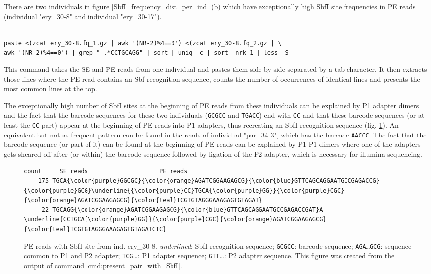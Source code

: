 \documentclass[a4paper,12pt,times,print,index,custombib,custommargin]{PhDThesisPSnPDF}\usepackage[]{graphicx}\usepackage[]{color}
\begin{document}
There are two individuals in figure \ref{SbfI_frequency_dist_per_ind} (b) which have exceptionally high SbfI site frequencies in PE reads (individual "ery\_30-8" and individual "ery\_30-17").
%
\begin{cmd}
\captionsetup{type=cmd} %
\begin{Verbatim}[formatcom=\color{darkgray}, fontsize=\scriptsize]

paste <(zcat ery_30-8.fq_1.gz | awk '(NR-2)%4==0') <(zcat ery_30-8.fq_2.gz | \
awk '(NR-2)%4==0') | grep " .*CCTGCAGG" | sort | uniq -c | sort -nrk 1 | less -S
\end{Verbatim}
\caption{\small This command takes the SE and PE reads from one individual and pastes them side by side separated by a tab character. It then extracts those lines where the PE read contains an Sbf recognition sequence, counts the number of occurrences of identical lines and presents the most common lines at the top.}
\label{cmd:present_pair_with_SbfI}
\end{cmd}
%
The exceptionally high number of SbfI sites at the beginning of PE reads from these individuals can be explained by P1 adapter dimers and the fact that the barcode sequences for these two individuals (\texttt{GCGCC} and \texttt{TGACC}) end with \texttt{CC} and that these barcode sequences (or at least the \texttt{CC} part) appear at the beginning of PE reads into P1 adapters, thus recreating an SbfI recognition sequence (fig. \ref{SbfI_in_PE_reads_of_ery_30-8}). An equivalent but not as frequent pattern can be found in the reads of individual "par\_34-3", which has the barcode \texttt{AACCC}. The fact that the barcode sequence (or part of it) can be found at the beginning of PE reads can be explained by P1-P1 dimers where one of the adapters gets sheared off after (or within) the barcode sequence followed by ligation of the P2 adapter, which is necessary for illumina sequencing. 
%
\begin{figure}
\begin{Verbatim}[fontfamily=courier, fontsize=\tiny, commandchars=\\\{\}]
  count		SE reads					PE reads
    175 TGCA{\color{purple}GGCGC}{\color{orange}AGATCGGAAGAGCG}{\color{blue}GTTCAGCAGGAATGCCGAGACCG} {\color{purple}GCG}\underline{{\color{purple}CC}TGCA{\color{purple}GG}}{\color{purple}CGC}{\color{orange}AGATCGGAAGAGCG}{\color{teal}TCGTGTAGGGAAAGAGTGTAGAT}
     22 TGCAGG{\color{orange}AGATCGGAAGAGCG}{\color{blue}GTTCAGCAGGAATGCCGAGACCGAT}A \underline{CCTGCA{\color{purple}GG}}{\color{purple}CGC}{\color{orange}AGATCGGAAGAGCG}{\color{teal}TCGTGTAGGGAAAGAGTGTAGATCTC}
\end{Verbatim}
\caption{PE reads with SbfI site from ind. ery\_30-8. \emph{underlined}: SbfI recognition sequence; {\color{purple}\texttt{GCGCC}}: barcode sequence; {\color{orange}\texttt{AGA\ldots GCG}}: sequence common to P1 and P2 adapter; {\color{teal}\texttt{TCG}\ldots}: P1 adapter sequence; {\color{blue}\texttt{GTT}\ldots}: P2 adapter sequence. This figure was created from the output of command \ref{cmd:present_pair_with_SbfI}.}
\label{SbfI_in_PE_reads_of_ery_30-8}
\end{figure}
\end{document}
